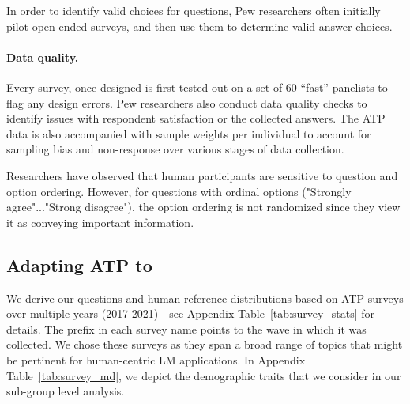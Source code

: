 In order to identify valid choices for questions, Pew researchers often initially pilot open-ended surveys, and then use them to determine valid answer choices.

\paragraph{Data quality.}
Every survey, once designed is first tested out on a set of 60 ``fast'' panelists to flag any design errors.
Pew researchers also conduct data quality checks to identify issues with respondent satisfaction or the collected answers.
The ATP data is also accompanied with sample weights per individual to account for sampling bias and non-response over various stages of data collection.

Researchers have observed that human participants are sensitive to question and option ordering.
However, for questions with ordinal options ("Strongly agree"..."Strong disagree"), the option ordering is not randomized since they view it as conveying important information.

\subsection{Adapting ATP to \bname}
\label{app:survey_curation}
\label{app:taxonomize}

We derive our questions and human reference distributions based on \nsurveys ATP surveys over multiple years (2017-2021)---see Appendix Table~\ref{tab:survey_stats} for details.
The prefix in each survey name points to the wave in which it was collected.
We chose these surveys as they span a broad range of topics that might be pertinent for human-centric LM applications.
In Appendix Table~\ref{tab:survey_md}, we depict the demographic traits that we consider in our sub-group level analysis. 


